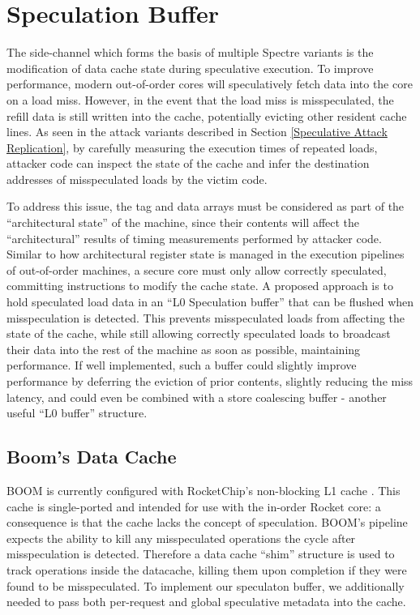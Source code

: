 \section{Speculation Buffer} \label{Speculation Buffer}

The side-channel which forms the basis of multiple Spectre variants is the modification of data cache state during speculative execution.
To improve performance, modern out-of-order cores will speculatively fetch data into the core on a load miss.
However, in the event that the load miss is misspeculated, the refill data is still written into the cache, potentially evicting other resident cache lines.
As seen in the attack variants described in Section \ref{Speculative Attack Replication}, by carefully measuring the execution times of repeated loads, attacker code can inspect the state of the cache and infer the destination addresses of misspeculated loads by the victim code.

To address this issue, the tag and data arrays must be considered as part of the ``architectural state'' of the machine, since their contents will affect the ``architectural'' results of timing measurements performed by attacker code.
Similar to how architectural register state is managed in the execution pipelines of out-of-order machines, a secure core must only allow correctly speculated, committing instructions to modify the cache state.
A proposed approach is to hold speculated load data in an ``L0 Speculation buffer'' that can be flushed when misspeculation is detected.
This prevents misspeculated loads from affecting the state of the cache, while still allowing correctly speculated loads to broadcast their data into the rest of the machine as soon as possible, maintaining performance. If well implemented, such a buffer could slightly improve performance by deferring the eviction of prior contents, slightly reducing the miss latency, and could even be combined with a store coalescing buffer - another useful ``L0 buffer'' structure.

\subsection{Boom's Data Cache}
BOOM is currently configured with RocketChip's non-blocking L1 cache \cite{b54}. This cache is single-ported and intended for use with the in-order Rocket core: a consequence is that the cache lacks the concept of speculation. BOOM's pipeline expects the ability to kill any misspeculated operations the cycle after misspeculation is detected. Therefore a data cache ``shim'' structure is used to track operations inside the datacache, killing them upon completion if they were found to be misspeculated. To implement our speculaton buffer, we additionally needed to pass both per-request and global speculative metadata into the cache.

